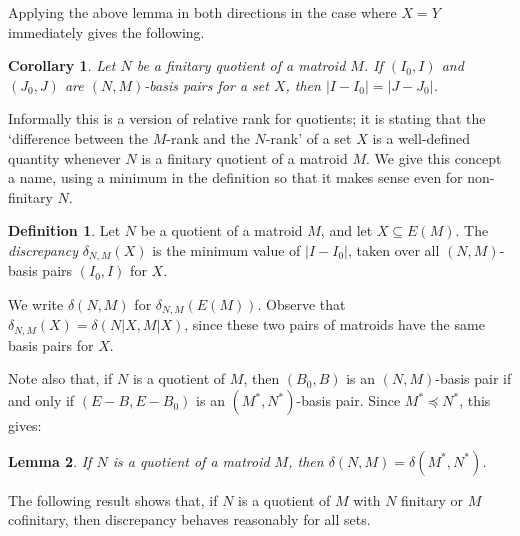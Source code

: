 \documentclass{amsart}
\theoremstyle{plain}
\newtheorem{theorem}{Theorem}[section]
\newtheorem{lemma}[theorem]{Lemma}
\newtheorem{corollary}[theorem]{Corollary}
\newcounter{defn}
\theoremstyle{definition}
\newtheorem{definition}[defn]{Definition}
\renewcommand{\ss}{\subseteq}
\begin{document}
Applying the above lemma in both directions in the case where $X = Y$ immediately gives the following. 

\begin{corollary}\label{basispairstable}
  Let $N$ be a finitary quotient of a matroid $M$. 
  If $(I_0, I)$ and $(J_0,J)$ are $(N,M)$-basis pairs for a set $X$, 
  then $|I - I_0| = |J - J_0|$. 
\end{corollary}

Informally this is a version of relative rank for quotients;
it is stating that the `difference between the $M$-rank and the $N$-rank' of a set $X$ 
is a well-defined quantity whenever $N$ is a finitary quotient of a matroid $M$. 
We give this concept a name, using a minimum in the definition so that it makes sense even for non-finitary $N$.

\begin{definition}
  Let $N$ be a quotient of a matroid $M$, and let $X \ss E(M)$. The \emph{discrepancy} $\delta_{N,M}(X)$
  is the minimum value of $|I - I_0|$, taken over all $(N,M)$-basis pairs $(I_0,I)$ for $X$.
\end{definition}

We write $\delta(N,M)$ for $\delta_{N,M}(E(M))$.
Observe that $\delta_{N,M}(X) = \delta(N|X, M|X)$, since these two pairs of matroids have the same basis pairs for $X$. 



Note also that, if $N$ is a quotient of $M$, then $(B_0,B)$ is an $(N,M)$-basis pair
if and only if $(E-B, E-B_0)$ is an $(M^*,N^*)$-basis pair. Since $M^* \preceq N^*$, 
this gives:

\begin{lemma}\label{discdual}
  If $N$ is a quotient of a matroid $M$, then $\delta(N,M) = \delta(M^*,N^*)$. 
\end{lemma}

The following result shows that, if $N$ is a quotient of $M$ with 
$N$ finitary or $M$ cofinitary, then discrepancy behaves reasonably for all sets.
\end{document}
